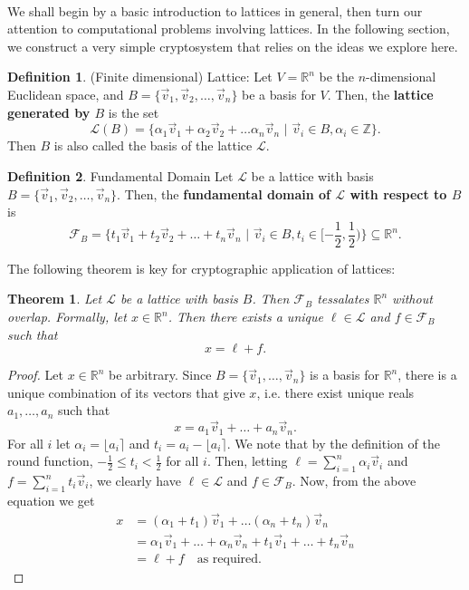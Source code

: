 \documentclass{article}
\newtheorem{theorem}{Theorem}[section]
\theoremstyle{definition}
\newtheorem{definition}{Definition}[section]
\theoremstyle{example}
\renewcommand{\L}{\mathcal{L}}
\newcommand{\F}{\mathcal{F}}
\newcommand{\Int}{\mathbb{Z}}
\newcommand{\Reals}{\mathbb{R}}
\begin{document}
\paragraph{} We shall begin by a basic introduction to lattices in general, then
turn our attention to computational problems involving lattices. In the
following section, we construct a very simple cryptosystem that relies on the
ideas we explore here.
\begin{definition}{(Finite dimensional) Lattice:}
  Let $V = \Reals^n$ be the $n$-dimensional Euclidean space, and $B = \{\vec{v}_1,
  \vec{v}_2, \hdots, \vec{v}_n\}$ be a basis for $V$. Then, the \textbf{lattice generated by $B$} is the set
  \[
    \L(B) = \{\alpha_1\vec{v}_1 + \alpha_2\vec{v}_2 + \hdots \alpha_n\vec{v}_n\,\,|\,\, \vec{v}_i \in B,
    \alpha_i \in \Int\}.
  \]
  Then $B$ is also called the basis of the lattice $\L$.
\end{definition}
\begin{definition}{Fundamental Domain}
  Let $\L$ be a lattice with basis $B = \{\vec{v}_1, \vec{v}_2, \hdots, \vec{v}_n\}$. Then, the
  \textbf{fundamental domain of $\L$ with respect to $B$} is
  \[
    \F_B = \{t_1\vec{v}_1 + t_2\vec{v}_2 + \hdots + t_n\vec{v}_n \,\,|\,\, \vec{v}_i \in B, t_i \in [-\frac12,
    \frac12)\} \subseteq \Reals^n.
  \]
\end{definition}
The following theorem is key for cryptographic application of lattices:
\begin{theorem}
  Let $\L$ be a lattice with basis $B$. Then $\F_B$ tessalates $\Reals^n$
  without overlap. Formally, let $x \in \Reals^n$. Then there exists a unique $\ell \in \L$
  and $f \in \F_B$ such that
\[
  x = \ell + f.
\]
\end{theorem}
\begin{proof}
  Let $x \in \Reals^n$ be arbitrary. Since $B = \{ \vec{v}_1, \hdots, \vec{v}_n \}$ is a basis for $\Reals^n$, there
  is a unique combination of its vectors that give $x$, i.e. there exist unique
  reals $a_1, \hdots, a_n$ such that
  \[
    x = a_1\vec{v}_1 + \hdots + a_n\vec{v}_n.
  \]
  For all $i$ let $\alpha_i = \lfloor a_i \rceil$ and $t_i = a_i - \lfloor a_i
  \rceil$. We note that by the definition of the round function, $-\frac12 \leq t_i <
  \frac12$ for all $i$. Then, letting $\ell = \sum_{i = 1}^n \alpha_i\vec{v}_i$ and $f
  = \sum_{i = 1}^n t_i\vec{v}_i$, we clearly have $\ell \in \L$ and $f \in
  \F_B$. Now, from the above equation we get
  \begin{align*}
    x &= (\alpha_1 + t_1)\vec{v}_1 + \hdots (\alpha_n + t_n)\vec{v}_n \\
      &= \alpha_1\vec{v}_1 + \hdots + \alpha_n\vec{v}_n + t_1\vec{v}_1 + \hdots + t_n\vec{v}_n \\
      &= \ell + f \quad \text{as required.}
  \end{align*}
\end{proof}
\end{document}
